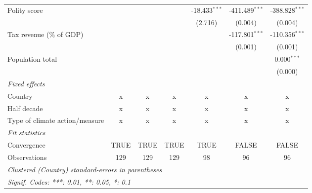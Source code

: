 \begin{tabular}{lcccccc}
   Polity score                                                          &          &          &          & -18.433$^{***}$ & -411.489$^{***}$   & -388.828$^{***}$\\   
                                                                         &          &          &          & (2.716)         & (0.004)            & (0.004)\\   
   Tax revenue (\% of GDP)                                               &          &          &          &                 & -117.801$^{***}$   & -110.356$^{***}$\\   
                                                                         &          &          &          &                 & (0.001)            & (0.001)\\   
   Population total                                                      &          &          &          &                 &                    & 0.000$^{***}$\\   
                                                                         &          &          &          &                 &                    & (0.000)\\   
   \emph{Fixed effects}\\
   Country                                                               & x        & x        & x        & x               & x                  & x\\  
   Half decade                                                           & x        & x        & x        & x               & x                  & x\\  
   Type of climate action/measure                                        & x        & x        & x        & x               & x                  & x\\  
   \midrule \emph{Fit statistics}\\
   Convergence                                                           &TRUE      & TRUE     & TRUE     & TRUE            & FALSE              & FALSE\\  
   Observations                                                          & 129      & 129      & 129      & 98              & 96                 & 96\\  
   \midrule
   \multicolumn{7}{l}{\emph{Clustered (Country) standard-errors in parentheses}}\\
   \multicolumn{7}{l}{\emph{Signif. Codes: ***: 0.01, **: 0.05, *: 0.1}}\\
\end{tabular}
\par\endgroup


